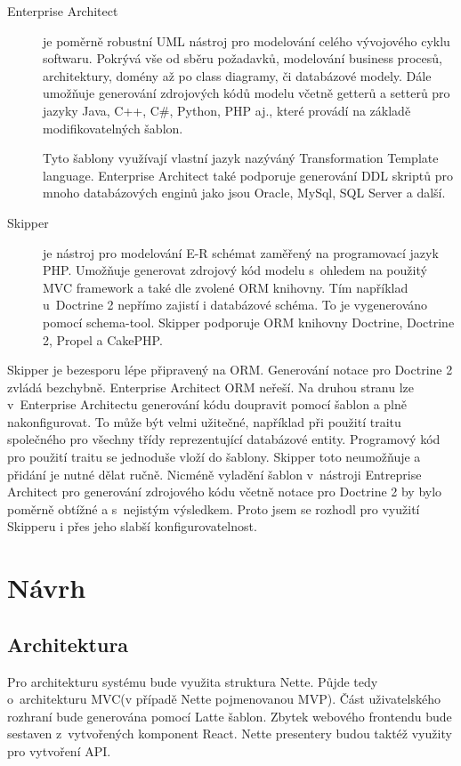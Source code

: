 \documentclass[thesis=B,czech]{FITthesis}[2012/06/26]
\begin{document}
\begin{description}
	\item[Enterprise Architect]
	je poměrně robustní UML nástroj pro modelování celého vývojového cyklu softwaru. Pokrývá vše od sběru požadavků, modelování business procesů, architektury, domény až po class diagramy, či databázové modely. Dále umožňuje generování zdrojových kódů modelu včetně getterů a setterů pro jazyky Java, C++, C\#, Python, PHP aj., které provádí na základě modifikovatelných šablon.
	
	Tyto šablony využívají vlastní jazyk nazýváný Transformation Template language. Enterprise Architect také podporuje generování DDL skriptů pro mnoho databázových enginů jako jsou Oracle, MySql, SQL Server a další.\cite{enterprise_architect}

	\item[Skipper\cite{skipper}]
	je nástroj pro modelování E-R schémat zaměřený na programovací jazyk PHP. Umožňuje generovat zdrojový kód modelu s~ohledem na použitý MVC framework a také dle zvolené ORM knihovny. Tím například u~Doctrine 2 nepřímo zajistí i databázové schéma. To je vygenerováno pomocí schema-tool. Skipper podporuje ORM knihovny Doctrine, Doctrine 2, Propel a CakePHP.\cite{skipper_features}
\end{description}

	Skipper je bezesporu lépe připravený na ORM. Generování notace pro Doctrine 2 zvládá bezchybně. Enterprise Architect ORM neřeší. Na druhou stranu lze v~Enterprise Architectu generování kódu doupravit pomocí šablon a plně nakonfigurovat. To může být velmi užitečné, například při použití traitu společného pro všechny třídy reprezentující databázové entity. Programový kód pro použití traitu se jednoduše vloží do šablony. Skipper toto neumožňuje a přidání je nutné dělat ručně. Nicméně vyladění šablon v~nástroji Entreprise Architect pro generování zdrojového kódu včetně notace pro Doctrine 2 by bylo poměrně obtížné a s~nejistým výsledkem. Proto jsem se rozhodl pro využití Skipperu i přes jeho slabší konfigurovatelnost.	


\chapter{Návrh}

\section{Architektura}
Pro architekturu systému bude využita struktura Nette. Půjde tedy o~architekturu MVC(v případě Nette pojmenovanou MVP). Část uživatelského rozhraní bude generována pomocí Latte šablon. Zbytek webového frontendu bude sestaven z~vytvořených komponent React. Nette presentery budou taktéž využity pro vytvoření API.
\end{document}
